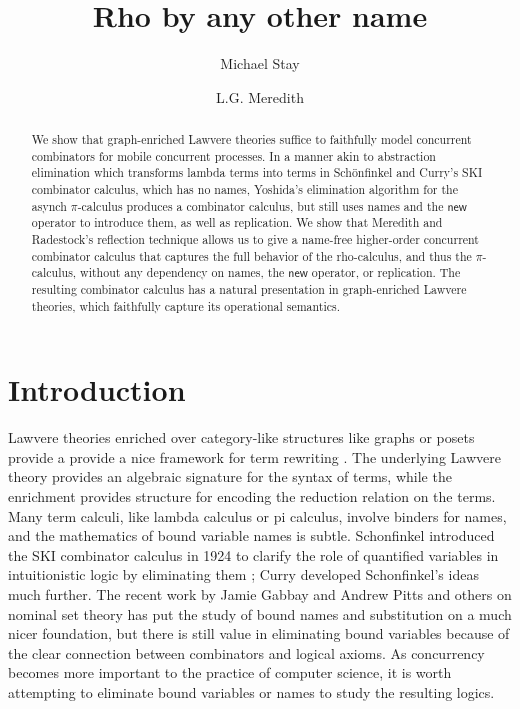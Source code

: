 \documentclass{llncs}
\title{Rho by any other name}
\author{
Michael Stay\inst{1}\\
\and
L.G. Meredith\inst{2}\\
}
\institute{
  {Pyrofex Corp.}\\
  \email{\fontsize{8}{8}\selectfont stay@pyrofex.net}\\
  \and
  {RChain Cooperative}\\
  \email{\fontsize{8}{8}\selectfont greg@rchain.coop}
}
\newcommand{\pic}{$\pi$-calculus}
\begin{document}
\maketitle
\begin{abstract}
\noindent
  We show that graph-enriched Lawvere theories suffice to faithfully
  model concurrent combinators for mobile concurrent processes. In a
  manner akin to abstraction elimination which transforms lambda terms
  into terms in Schönfinkel and Curry's SKI combinator calculus, which
  has no names, Yoshida's elimination algorithm for the asynch \pic
  produces a combinator calculus,
  but still uses names and the $\mathsf{new}$ operator to introduce
  them, as well as replication.  We show that Meredith and Radestock's
  reflection technique allows
  us to give a name-free higher-order concurrent combinator calculus
  that captures the full behavior of the rho-calculus, and thus the
  \pic, without any dependency on names, the $\mathsf{new}$ operator,
  or replication. The resulting combinator calculus has a natural
  presentation in graph-enriched Lawvere theories, which faithfully
  capture its operational semantics.

\end{abstract}

\section{Introduction}
  
  Lawvere theories enriched over category-like structures like graphs or posets provide a 
provide a nice framework for term rewriting \cite{GhaniLuth}.  The underlying Lawvere theory provides an algebraic signature for the syntax of terms, while the enrichment provides structure for encoding the reduction relation on the terms.
Many term calculi, like lambda calculus or pi calculus, involve binders for names, and the mathematics of bound variable names is subtle.  Sch\:onfinkel
introduced the SKI combinator calculus in 1924 to clarify the role of
quantified variables in intuitionistic logic by eliminating them
\cite{finkel}; Curry developed Sch\:onfinkel's ideas much further.  The recent
work by Jamie Gabbay and Andrew Pitts
\cite{DBLP:journals/fac/GabbayP02} and others
\cite{DBLP:journals/jcss/Clouston14} on nominal set theory has put the
study of bound names and substitution on a much nicer foundation, but
there is still value in eliminating bound variables because of the
clear connection between combinators and logical axioms.  As
concurrency becomes more important to the practice of computer science, it is worth
attempting to eliminate bound variables or names to study the
resulting logics.
\end{document}

